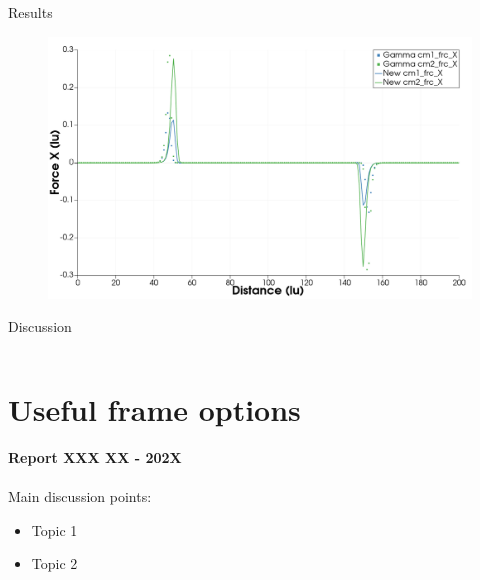 \documentclass[8pt]{beamer}
\begin{document}
	\begin{frame}{Results}
		\begin{figure}
			\centering
			\includegraphics[width=\textwidth]{pics/1dnewForce/forceX.png}
		\end{figure}
	\end{frame}

	\begin{frame}{Discussion}
	\begin{columns}
		
		
		
		
	\end{columns}
	\end{frame}



	\section*{Useful frame options}
	\label{}
	\justifying
	\begin{frame}
		\textbf{Report XXX XX - 202X}\\~\\
		Main discussion points:
		\begin{itemize}
			\item Topic 1
			\item Topic 2
		\end{itemize}
	\end{frame}
\end{document}
